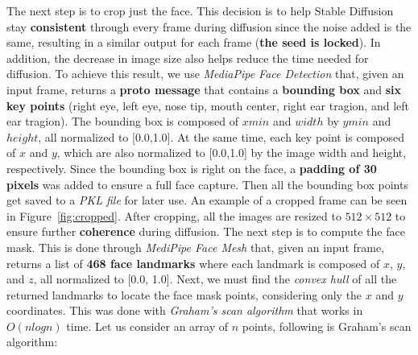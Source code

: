 \documentclass[preprint]{elsarticle}
\begin{document}
The next step is to crop just the face. 
This decision is to help Stable Diffusion stay \textbf{consistent} through every frame during diffusion since the noise added is the same, 
resulting in a similar output for each frame (\textbf{the seed is locked}). 
In addition, the decrease in image size also helps reduce the time needed for diffusion. 
To achieve this result, we use \emph{MediaPipe Face Detection} that, given an input frame, 
returns a \textbf{proto message} that contains a \textbf{bounding box} and \textbf{six key points} (right eye, left eye, nose tip, mouth center, right ear tragion, and left ear tragion). 
The bounding box is composed of $xmin$ and $width$ by $ymin$ and $height$, all normalized to [0.0,1.0]. 
At the same time, each key point is composed of $x$ and $y$, which are also normalized to [0.0,1.0] by the image width and height, respectively. 
Since the bounding box is right on the face, a \textbf{padding of 30 pixels} was added to ensure a full face capture.
Then all the bounding box points get saved to a \emph{PKL file} for later use. 
An example of a cropped frame can be seen in Figure~\ref{fig:cropped}.
After cropping, all the images are resized to $512 \times 512$ to ensure further \textbf{coherence} during diffusion. 
The next step is to compute the face mask. 
This is done through \emph{MediPipe Face Mesh} that, given an input frame, returns a list of \textbf{468 face landmarks} 
where each landmark is composed of $x$, $y$, and $z$, all normalized to  [0.0, 1.0]. 
Next, we must find the \emph{convex hull} of all the returned landmarks to locate the face mask points, considering only the $x$ and $y$ coordinates. 
This was done with \emph{Graham's scan algorithm} \cite{GRAHAM1972132} that works in $O(n log n)$ time. Let us consider an array of $n$ points, following is Graham's scan algorithm:
\end{document}
